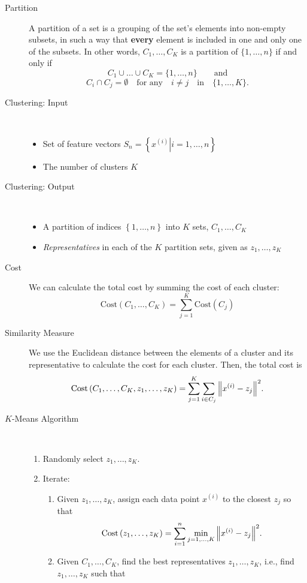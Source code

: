 \documentclass[10pt,landscape,a4paper]{article}
\begin{document}
\begin{multicols*}{3}
\begin{description}
\begin{center}
	\end{center}
	\item[Partition] A partition of a set is a grouping of the set's elements into non-empty subsets, in such a way that {\bf every} element is included in one and only one of the subsets. In other words, $C_1,\dots,C_K$ is a partition of $\{1,\dots,n\}$ if and only if $$C_1\cup\dots\cup C_K=\{1,\dots,n\}\qquad\text{and}$$
	$$C_i\cap C_j=\emptyset\quad\text{for any}\quad i\neq j\quad\text{in}\quad\{1,\dots,K\}.$$
	\item[Clustering: Input] ~
	\begin{itemize}[]
		\item Set of feature vectors $S_n=\left\{\left.x^{(i)}\right|i=1,\dots,n\right\}$
		\item The number of clusters $K$
	\end{itemize}
	\item[Clustering: Output] ~
	\begin{itemize}[]
		\item A partition of indices $\left\{1,\dots,n\right\}$ into $K$ sets, $C_1,\dots,C_K$
		\item {\it Representatives} in each of the $K$ partition sets, given as $z_1,\dots,z_K$
	\end{itemize}
	\item[Cost] We can calculate the total cost by summing the cost of each cluster:
	$$\text{Cost}\left(C_1,\dots,C_K\right)=\sum_{j=1}^{K}\text{Cost}\left(C_j\right)$$
	\item[Similarity Measure] We use the Euclidean distance between the elements of a cluster and its representative to calculate the cost for each cluster. Then, the total cost is
	$$\text{Cost}\left(C_1,\dots,C_K,z_1,\dots,z_K\right)=\sum_{j=1}^{K}\sum_{i\in C_j}\norm{x^{(i)}-z_j}^2.$$
	\item[$K$-Means Algorithm] ~
	\begin{enumerate}
		\item Randomly select $z_1,\dots,z_K$.
		\item Iterate:
		\begin{enumerate}
			\item Given $z_1,\dots,z_K$, assign each data point $x^{(i)}$ to the closest $z_j$ so that
			$$\text{Cost}\left(z_1,\dots,z_K\right)=\sum_{i=1}^{n}\min\limits_{j=1,\dots,K}\norm{x^{(i)}-z_j}^2.$$
			\item Given $C_1,\dots,C_K$, find the best representatives $z_1,\dots,z_K$, i.e., find $z_1,\dots,z_K$ such that

\end{enumerate}
\end{enumerate}
\end{description}
\end{multicols*}
\end{document}
